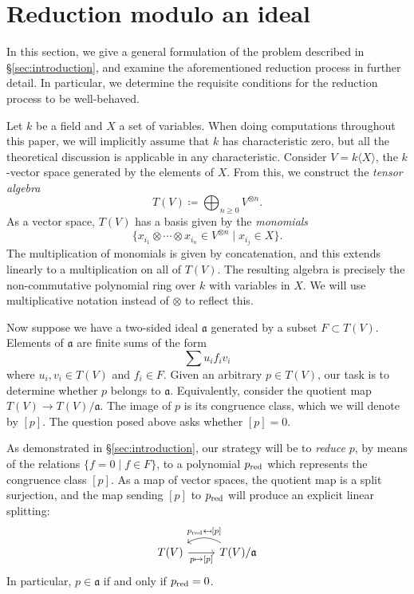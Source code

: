 \section{Reduction modulo an ideal}\label{sec:grobner-theorem}
In this section, we give a general formulation of the problem described in \S\ref{sec:introduction}, and examine the aforementioned reduction process in further detail. In particular, we determine the requisite conditions for the reduction process to be well-behaved.

Let $k$ be a field and $X$ a set of variables. When doing computations throughout this paper, we will implicitly assume that $k$ has characteristic zero, but all the theoretical discussion is applicable in any characteristic. Consider $V = k\langle X \rangle$, the $k$-vector space generated by the elements of $X$. From this, we construct the \emph{tensor algebra}
\[
	T(V) \coloneqq \bigoplus_{n\geq 0} V^{\otimes n}.
\]
As a vector space, $T(V)$ has a basis given by the \emph{monomials}
\[
	\{x_{i_1}\otimes \cdots \otimes x_{i_n} \in V^{\otimes n} \mid x_{i_j} \in X\}.
\]
The multiplication of monomials is given by concatenation, and this extends linearly to a multiplication on all of $T(V)$. The resulting algebra is precisely the non-commutative polynomial ring over $k$ with variables in $X$. We will use multiplicative notation instead of $\otimes$ to reflect this.

Now suppose we have a two-sided ideal $\mathfrak{a}$ generated by a subset $F\subset T(V)$. Elements of $\mathfrak{a}$ are finite sums of the form
\[
	\sum u_i f_i v_i
\]
where $u_i, v_i \in T(V)$ and $f_i \in F$.
Given an arbitrary $p\in T(V)$, our task is to determine whether $p$ belongs to $\mathfrak{a}$. Equivalently, consider the quotient map $T(V) \to T(V)/\mathfrak{a}$. The image of $p$ is its congruence class, which we will denote by $[p]$. The question posed above asks whether $[p]=0$.

As demonstrated in \S\ref{sec:introduction}, our strategy will be to \emph{reduce} $p$, by means of the relations $\{f=0 \mid f\in F\}$, to a polynomial $p_{\mathrm{red}}$ which represents the congruence class $[p]$. As a map of vector spaces, the quotient map is a split surjection, and the map sending $[p]$ to $p_{\mathrm{red}}$ will produce an explicit linear splitting:
\[\begin{tikzcd}
	T(V) \arrow[r, "p \mapsto {[p]}",swap] & \arrow[l,bend right, swap," p_\red \mapsfrom {[p]}"] T(V)/\mathfrak{a}
\end{tikzcd}\]
In particular, $p \in \mathfrak{a}$ if and only if $p_{\mathrm{red}} = 0$.

